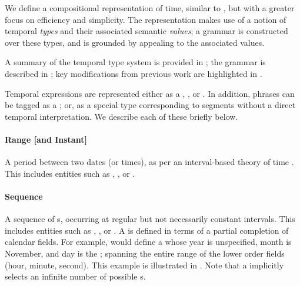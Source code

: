We define a compositional representation of time, similar to \me, but with
  a greater focus on efficiency and simplicity.
The representation makes use of a notion of temporal \textit{types} and
  their associated semantic \textit{values};
  a grammar is constructed over these types, and is grounded by appealing
  to the associated values.

A summary of the temporal type system is provided in ;
  the grammar is described in ;
  key modifications from previous work are highlighted in .

Temporal expressions are represented either as a , ,
	or .
In addition, phrases can be tagged as a ; or, as a
  special  type corresponding to segments 
  without a direct temporal interpretation.
We describe each of these briefly below.

\paragraph{Range [and Instant]}
A period between two dates (or times), as per an interval-based theory of
  time \cite{key:1981allen-temporal}.
This includes entities such as , , or
	.


\paragraph{Sequence}
A sequence of s, occurring at regular but not necessarily constant
  intervals.
This includes entities such as , , or
	.
A  is defined in terms of a partial completion of calendar fields.
For example,  would define a  whose
  year is unspecified,
  month is November, and day is the ; spanning the entire range of the
  lower order fields (hour, minute, second).
This example is illustrated in .
Note that a  implicitly selects an infinite number of possible 
  s.

